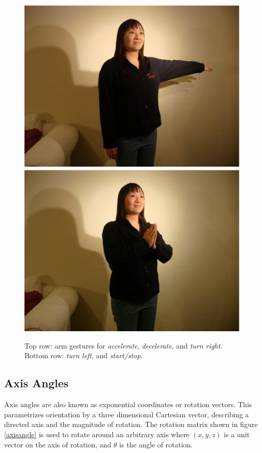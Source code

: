 \documentclass[12pt,a4,notitlepage]{report}
\renewcommand{\_}{\texttt{\symbol{95}}}
\newcommand{\<}{\texttt{\symbol{60}}}
\renewcommand{\>}{\texttt{\symbol{62}}}
\begin{document}
\begin{figure}
\includegraphics[scale=0.3,angle=0]{images/right.ps}
\includegraphics[scale=0.3,angle=0]{images/startstop.ps}
\caption{Top row: arm gestures for \textit{accelerate}, \textit{decelerate}, and \textit{turn right}. 
Bottom row: \textit{turn left}, and \textit{start/stop}.}
\label{gestures}
\end{figure}

\subsection{Axis Angles}

Axis angles are also known as exponential coordinates or rotation vectors. This parametrizes orientation by a three dimensional Cartesian vector, describing a directed axis and the magnitude of rotation. The rotation matrix shown in figure \ref{axisangle} is used to rotate around an arbitrary axis where $(x,y,z)$ is a unit vector on the axis of rotation, and $\theta$ is the angle of rotation.\cite{GraphicsGems}
\end{document}
